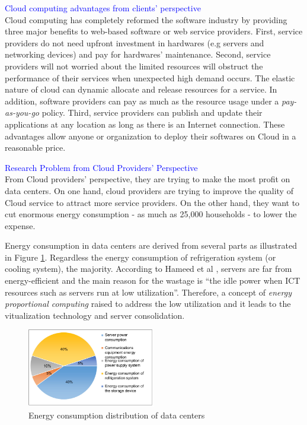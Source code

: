 \textcolor{Blue}{Cloud computing advantages from clients' perspective}\\
Cloud computing has completely reformed the software industry \cite{Buyya:2009ix} by providing three major benefits to web-based software or web service providers.
First, service providers do not need upfront investment in hardwares (e.g servers and networking devices) and pay for hardwares' maintenance. 
Second, service providers will not worried about the limited resources will obstruct the performance of their services when unexpected high demand occurs. The elastic nature of cloud can dynamic allocate and release resources for a service. In addition, software providers can pay as much as the resource usage under a \emph{pay-as-you-go} policy.
Third, service providers can publish and update their applications at any location 
as long as there is an Internet connection. 
These advantages allow anyone or organization to deploy their softwares on Cloud in
a reasonable price. 

\textcolor{Blue}{Research Problem from Cloud Providers' Perspective}\\
From Cloud providers' perspective, they are trying to make the most profit on data centers.
On one hand, cloud providers are trying to improve the quality of  Cloud service to attract more service providers.  
On the other hand, they want to cut enormous energy consumption 
- as much as 25,000 households \cite{Kaplan:up01fR-k} - to lower the expense. 

Energy consumption in data centers are derived from several parts as 
illustrated in Figure \ref{fig:consumption}. 
Regardless the energy consumption of refrigeration system (or cooling system), 
the majority. 
According to Hameed et al \cite{Hameed:2016cma}, 
servers are far from energy-efficient and 
the main reason for the wastage is ``the idle power when ICT resources such as servers run at low utilization''. Therefore, a concept of
\emph{energy proportional computing} \cite{Barroso:2007jt} raised to address the low utilization and it leads to 
the vitualization technology and server consolidation.
\begin{figure}
	\centering
	\includegraphics[width=0.5\textwidth]{pics/energyConsumption.png}
	\caption{Energy consumption distribution of data centers \cite{Rong:2016js}}
	\label{fig:consumption}
\end{figure}

